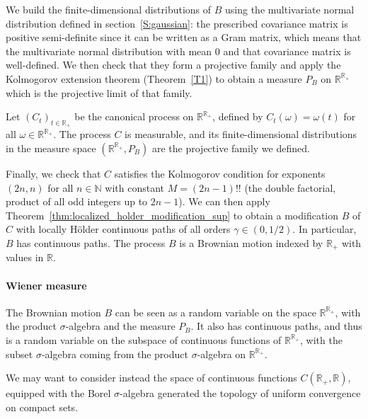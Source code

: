 \documentclass[lean]{Draft}
\begin{document}
We build the finite-dimensional distributions of $B$ using the multivariate normal distribution defined in section~\ref{S:gaussian}: the prescribed covariance matrix is positive semi-definite since it can be written as a Gram matrix, which means that the multivariate normal distribution with mean 0 and that covariance matrix is well-defined.
We then check that they form a projective family and apply the Kolmogorov extension theorem (Theorem~\ref{T1}) to obtain a measure $P_B$ on $\mathbb{R}^{\mathbb{R}_+}$ which is the projective limit of that family.

Let $(C_t)_{t \in \mathbb{R}_+}$ be the canonical process on $\mathbb{R}^{\mathbb{R}_+}$, defined by $C_t(\omega) = \omega(t)$ for all $\omega \in \mathbb{R}^{\mathbb{R}_+}$.
The process $C$ is measurable, and its finite-dimensional distributions in the measure space $(\mathbb{R}^{\mathbb{R}_+}, P_B)$ are the projective family we defined.

Finally, we check that $C$ satisfies the Kolmogorov condition for exponents $(2n, n)$ for all $n \in \mathbb{N}$ with constant $M = (2n - 1)!!$ (the double factorial, product of all odd integers up to $2n - 1$).
We can then apply Theorem~\ref{thm:localized_holder_modification_sup} to obtain a modification $B$ of $C$ with locally Hölder continuous paths of all orders $\gamma \in (0, 1/2)$.
In particular, $B$ has continuous paths.
The process $B$ is a Brownian motion indexed by $\mathbb{R}_+$ with values in $\mathbb{R}$.




\paragraph{Wiener measure}

The Brownian motion $B$ can be seen as a random variable on the space $\mathbb{R}^{\mathbb{R}_+}$, with the product $\sigma$-algebra and the measure $P_B$.
It also has continuous paths, and thus is a random variable on the subspace of continuous functions of $\mathbb{R}^{\mathbb{R}_+}$, with the subset $\sigma$-algebra coming from the product $\sigma$-algebra on $\mathbb{R}^{\mathbb{R}_+}$.

We may want to consider instead the space of continuous functions $C(\mathbb{R}_+, \mathbb{R})$, equipped with the Borel $\sigma$-algebra generated the topology of uniform convergence on compact sets.
\end{document}
